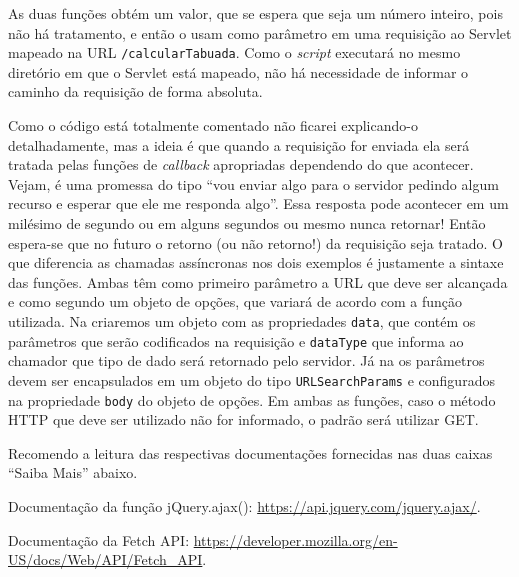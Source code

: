 
As duas funções obtém um valor, que se espera que seja um número inteiro, pois não há tratamento, e então o usam como parâmetro em uma requisição ao Servlet mapeado na URL \texttt{/calcularTabuada}. Como o \textit{script} executará no mesmo diretório em que o Servlet está mapeado, não há necessidade de informar o caminho da requisição de forma absoluta.

Como o código está totalmente comentado não ficarei explicando-o detalhadamente, mas a ideia é que quando a requisição for enviada ela será tratada pelas funções de \textit{callback} apropriadas dependendo do que acontecer. Vejam, é uma promessa do tipo ``vou enviar algo para o servidor pedindo algum recurso e esperar que ele me responda algo''. Essa resposta pode acontecer em um milésimo de segundo ou em alguns segundos ou mesmo nunca retornar! Então espera-se que no futuro o retorno (ou não retorno!) da requisição seja tratado. O que diferencia as chamadas assíncronas nos dois exemplos é justamente a sintaxe das funções. Ambas têm como primeiro parâmetro a URL que deve ser alcançada e como segundo um objeto de opções, que variará de acordo com a função utilizada. Na  criaremos um objeto com as propriedades \texttt{data}, que contém os parâmetros que serão codificados na requisição e \texttt{dataType} que informa ao chamador que tipo de dado será retornado pelo servidor. Já na  os parâmetros devem ser encapsulados em um objeto do tipo \texttt{URLSearchParams} e configurados na propriedade \texttt{body} do objeto de opções. Em ambas as funções, caso o método HTTP que deve ser utilizado não for informado, o padrão será utilizar GET.

Recomendo a leitura das respectivas documentações fornecidas nas duas caixas ``Saiba Mais'' abaixo.

\begin{saibaMais}
    Documentação da função jQuery.ajax(): \url{https://api.jquery.com/jquery.ajax/}.
\end{saibaMais}

\begin{saibaMais}
    Documentação da Fetch API: \url{https://developer.mozilla.org/en-US/docs/Web/API/Fetch_API}.
\end{saibaMais}

